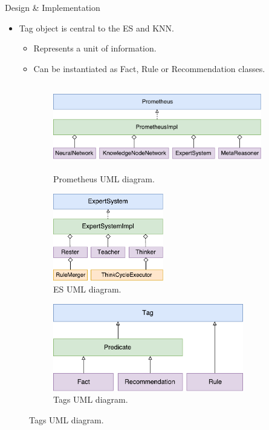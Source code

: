 \documentclass[final]{beamer} %
\begin{document}
\begin{frame}
\begin{columns}
\begin{column}{.34\textwidth}
{\begin{block}{Design \& Implementation}
					\begin{itemize}
						\item Tag object is central to the ES and KNN.
						\begin{itemize}
							\item Represents a unit of information.
							\item Can be instantiated as Fact, Rule or Recommendation classes.
						\end{itemize}
					\end{itemize}
				
					\begin{figure}
						\raggedleft
						\begin{subfigure}[b]{0.49\textwidth}
							\centering
							\includegraphics[height=1.5in]{figures/uml_prometheus.pdf}
							\caption{Prometheus UML diagram.}
						\end{subfigure}
						\begin{subfigure}[b]{0.49\textwidth}
							\centering
							\includegraphics[height=1.5in]{figures/uml_es.pdf}
							\caption{ES UML diagram.}
						\end{subfigure}
						\bigskip
						\begin{subfigure}[b]{0.49\textwidth}
							\centering
							\includegraphics[height=1.5in]{figures/uml_tags.pdf}
							\caption{Tags UML diagram.}

\end{subfigure}
\end{figure}
\end{block}}
\end{column}
\end{columns}
\end{frame}
\end{document}
